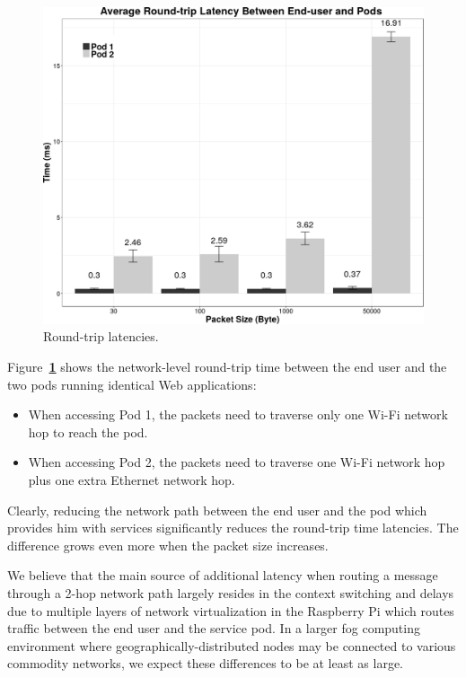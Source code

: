 \documentclass[letterpaper,twocolumn,10pt]{article}
\let\origref\ref
\def\ref#1{\textbf{\origref{#1}}}
\begin{document}
\begin{figure}[tbp]
  \centering
  \includegraphics[width=\linewidth]{images/graph.png}
  \caption{Round-trip latencies.}
  \label{fig:lat}
\end{figure}

Figure~\ref{fig:lat} shows the network-level round-trip time between
the end user and the two pods running identical Web applications:

\begin{itemize}
\item When accessing Pod 1, the packets need to traverse only one Wi-Fi
  network hop to reach the pod.
\item When accessing Pod 2, the packets need to traverse one Wi-Fi
  network hop plus one extra Ethernet network hop.
\end{itemize}

Clearly, reducing the network path between the end user and the pod
which provides him with services significantly reduces the round-trip
time latencies. The difference grows even more when the packet size
increases. 

We believe that the main source of additional latency when routing a
message through a 2-hop network path largely resides in the context
switching and delays due to multiple layers of network virtualization
in the Raspberry Pi which routes traffic between the end user and the
service pod. In a larger fog computing environment where
geographically-distributed nodes may be connected to various commodity
networks, we expect these differences to be at least as large.
\end{document}

